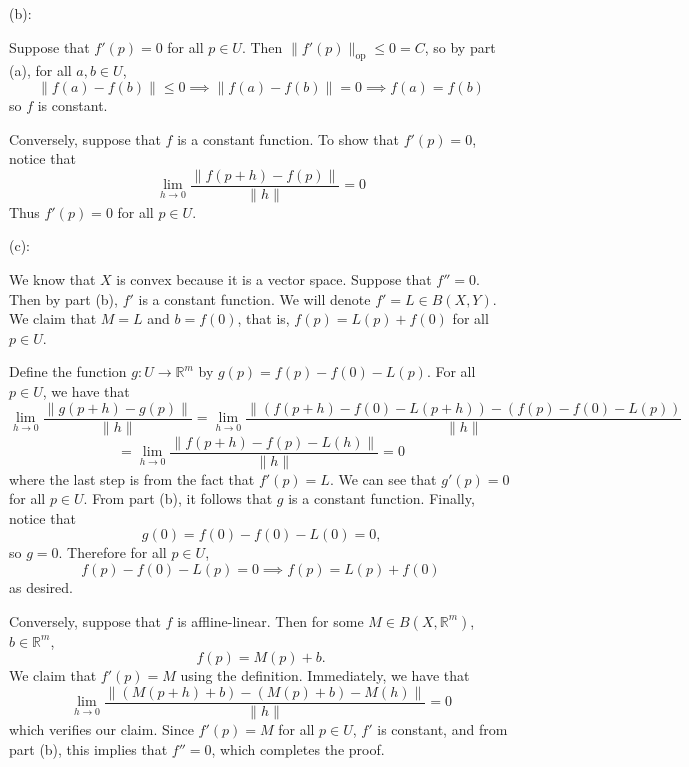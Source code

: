 \documentclass{article}
\newcommand{\op}{\mathrm{op}}
\theoremstyle{plain} %
\numberwithin{thm}{section} %
\theoremstyle{definition}
\begin{document}
\begin{question}{25}
    (b):
    
    Suppose that \(f'(p) = 0\) for all \(p \in U\). Then \(\|f'(p)\| _{\op} \leq 0 = C\), so by part (a), for all \(a,b \in U\),
    \[
        \|f(a) - f(b)\| \leq 0 \implies \|f(a) - f(b)\| = 0 \implies f(a) = f(b)
    \]
    so \(f\) is constant.

    Conversely, suppose that \(f\) is a constant function. To show that \(f'(p) = 0\), notice that
    \[
        \lim_{h \to 0} \frac{\|f(p + h) - f(p)\|}{\|h\|} = 0
    \]
    Thus \(f'(p) = 0\) for all \(p \in U\).

    (c):

    We know that \(X\) is convex because it is a vector space. Suppose that \(f'' = 0\). Then by part (b), \(f'\) is a constant function. We will denote \(f' = L \in B(X,Y)\). We claim that \(M = L\) and \(b = f(0)\), that is, \(f(p) = L(p) + f(0)\) for all \(p \in U\).

    Define the function \(g: U \to \mathbb{R}^m\) by \(g(p) = f(p) - f(0) - L(p)\). For all \(p \in U\), we have that
    \[
        \lim_{h \to 0} \frac{\|g(p + h) - g(p)\|}{\|h\|} = \lim_{h \to 0} \frac{\|(f(p+h) - f(0) - L(p+h)) - (f(p) - f(0) - L(p))}{\|h\|}
    \]
    \[
        = \lim_{h \to 0} \frac{\|f(p+h) - f(p) - L(h)\|}{\|h\|} = 0
    \]
    where the last step is from the fact that \(f'(p) = L\). We can see that \(g'(p) = 0\) for all \(p \in U\). From part (b), it follows that \(g\) is a constant function. Finally, notice that
    \[
        g(0) = f(0) - f(0) - L(0) = 0 \text{,} 
    \]
    so \(g = 0\). Therefore for all \(p \in U\),
    \[
        f(p) - f(0) - L(p) = 0 \implies f(p) = L(p) + f(0)
    \]
    as desired.

    Conversely, suppose that \(f\) is affline-linear. Then for some \(M \in B(X, \mathbb{R}^m)\), \(b \in \mathbb{R}^m\),
    \[
        f(p) = M(p) + b \text{.} 
    \]
    We claim that \(f'(p) = M\) using the definition. Immediately, we have that
    \[
        \lim_{h \to 0} \frac{\|(M(p+h) + b) - (M(p) + b) - M(h)\|}{\|h\|} = 0
    \]
    which verifies our claim. Since \(f'(p) = M\) for all \(p \in U\), \(f'\) is constant, and from part (b), this implies that \(f'' = 0\), which completes the proof.
    \end{question}
\end{document}
